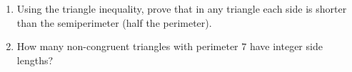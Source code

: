 \begin{enumerate}
\item[(a)] Using the triangle inequality, prove that in any triangle each side is shorter than the semiperimeter (half the perimeter).
\item[(b)] How many non-congruent triangles with perimeter $7$ have integer side lengths?
\end{enumerate}
